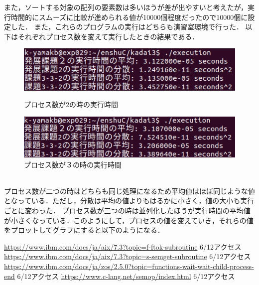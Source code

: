 \documentclass[dvipdfmx]{jarticle}
\begin{document}
また，ソートする対象の配列の要素数は多いほうが差が出やすいと考えたが，実行時間的にスムーズに比較が進められる値が10000個程度だったので10000個に設定した．
また，これらのプログラムの実行はどちらも演習室環境で行った．
以下はそれぞれプロセス数を変えて実行したときの結果である．
\begin{figure}[htbp]
    \begin{minipage}[b]{0.45\linewidth}
      \centering
      \includegraphics[keepaspectratio, scale=0.5]{resultproc2.png}
      \caption{プロセス数が2の時の実行時間}
    \end{minipage}
    \begin{minipage}[b]{0.45\linewidth}
      \centering
      \includegraphics[keepaspectratio, scale=0.5]{resultproc3.png}
      \caption{プロセス数が３の時の実行時間}
    \end{minipage}
  \end{figure}
\\プロセス数が二つの時はどちらも同じ処理になるため平均値はほぼ同じような値となっている．ただし，分散は平均の値よりもはるかに小さく，値の大小も実行ごとに変わった．
プロセス数が三つの時は並列化したほうが実行時間の平均値が小さくなっている．このようにして，プロセスの値を変えていき，それらの値をプロットしてグラフにすると以下のようになる．
\begin{thebibliography}{99}
     \url{https://www.ibm.com/docs/ja/aix/7.3?topic=f-ftok-subroutine} 6/12アクセス
     \url{https://www.ibm.com/docs/ja/aix/7.3?topic=s-semget-subroutine} 6/12アクセス
     \url{https://www.ibm.com/docs/ja/zos/2.5.0?topic=functions-wait-wait-child-process-end} 6/12アクセス
     \url{https://www.c-lang.net/semop/index.html} 6/12アクセス
\end{thebibliography}
\end{document}
